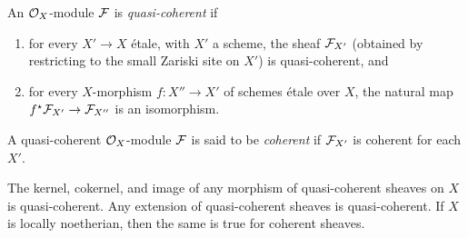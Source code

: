  \begin{definition}
   An $\mathcal{O}_X$-module $\mathcal{F}$ is \emph{quasi-coherent} if
   \begin{enumerate}
     \item for every $X'\to X$ \'etale, with $X'$ a scheme, the sheaf $\mathcal{F}_{X'}$ (obtained
     by restricting to the small Zariski site on $X'$) is quasi-coherent, and
     \item for every $X$-morphism $f:X''\to X'$ of schemes \'etale over $X$, the natural
     map $f^\star\mathcal{F}_{X'}\to \mathcal{F}_{X''}$ is an isomorphism.
   \end{enumerate}
   A quasi-coherent $\mathcal{O}_X$-module $\mathcal{F}$ is said to be \emph{coherent} if $\mathcal{F}_{X'}$ is
   coherent for each $X'$.
 \end{definition}
 \begin{remark} \label{lec15R:kernels,cokernels,etc._of_qcohs}
   The kernel, cokernel, and image of any morphism of quasi-coherent sheaves on $X$ is
   quasi-coherent. Any extension of quasi-coherent sheaves is quasi-coherent. If $X$ is
   locally noetherian, then the same is true for coherent sheaves. 
 \end{remark}


